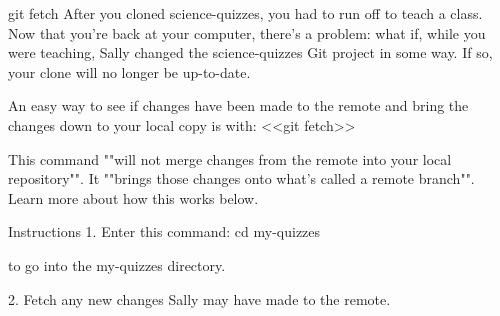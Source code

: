 git fetch
    After you cloned science-quizzes, you had to run off to teach a class. Now that you’re back at your computer, there’s a problem: what if, while you were teaching, Sally changed the science-quizzes Git project in some way. If so, your clone will no longer be up-to-date.

    An easy way to see if changes have been made to the remote and bring the changes down to your local copy is with:
        <<git fetch>>
    
    This command ""will not merge changes from the remote into your local repository"". It ""brings those changes onto what’s called a remote branch"". Learn more about how this works below.

Instructions
    1.
    Enter this command:
        cd my-quizzes
    
    to go into the my-quizzes directory.

    2.
    Fetch any new changes Sally may have made to the remote.